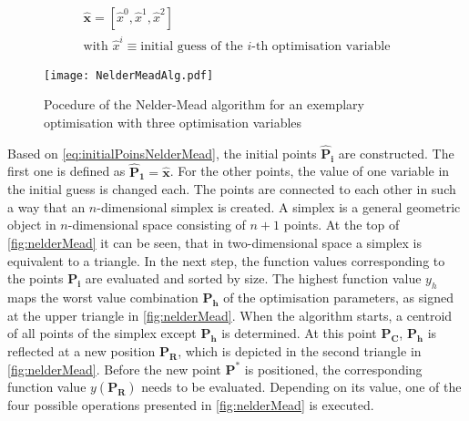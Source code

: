 \begin{gather}\label{eq:initialPoinsNelderMead}
    \mathbf{\hat{x}} = [\hat{x}^0, \hat{x}^1, \hat{x}^2] \\
    \text{with } \hat{x}^i \equiv \text{initial guess of the $i$-th optimisation variable} \nonumber
\end{gather}

\begin{figure}[H]
    \centering
    \texttt{[image: NelderMeadAlg.pdf]}
    \caption{Pocedure of the Nelder-Mead algorithm for an exemplary optimisation with three optimisation variables}
    \label{fig:nelderMead}
\end{figure}

Based on \autoref{eq:initialPoinsNelderMead}, the initial points $\mathbf{\hat{P}_i}$ are constructed. The first one is defined as $\mathbf{\hat{P}_1} = \mathbf{\hat{x}}$. For the other points, the value of one variable in the initial guess is changed each. The points are connected to each other in such a way that an $n$-dimensional simplex is created. A simplex is a general geometric object in $n$-dimensional space consisting of $n+1$ points. At the top of \autoref{fig:nelderMead} it can be seen, that in two-dimensional space a simplex is equivalent to a triangle.
In the next step, the function values corresponding to the points $\mathbf{P_i}$ are evaluated and sorted by size. The highest function value $y_h$ maps the worst value combination $\mathbf{P_h}$ of the optimisation parameters, as signed at the upper triangle in \autoref{fig:nelderMead}. When the algorithm starts, a centroid of all points of the simplex except $\mathbf{P_h}$ is determined. At this point $\mathbf{P_C}$, $\mathbf{P_h}$ is reflected at a new position $\mathbf{P_R}$, which is depicted in the second triangle in \autoref{fig:nelderMead}. Before the new point $\mathbf{P^{*}}$ is positioned, the corresponding function value $y(\mathbf{P_R})$ needs to be evaluated. Depending on its value, one of the four possible operations presented in \autoref{fig:nelderMead} is executed. 
